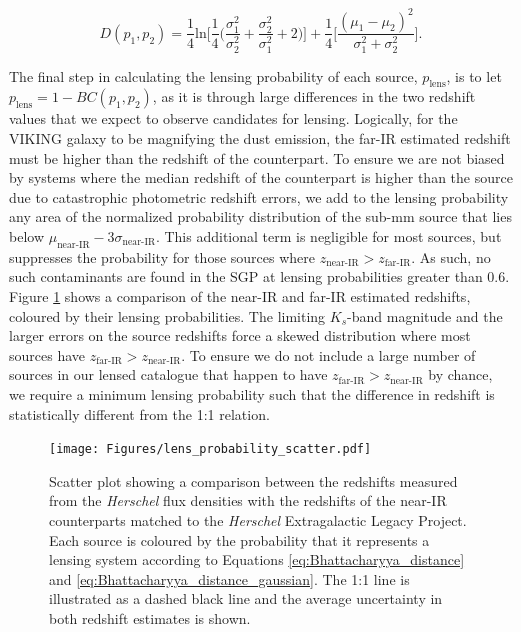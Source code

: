 \begin{equation}
    D(p_1, p_2) = \frac{1}{4}\textrm{ln}\Bigg[\frac{1}{4}\Bigg(\frac{\sigma_1^2}{\sigma_2^2}+\frac{\sigma_2^2}{\sigma_1^2}+2\Bigg)\Bigg] + \frac{1}{4}\Bigg[\frac{(\mu_1 - \mu_2)^2}{\sigma_1^2 + \sigma_2^2}\Bigg].
\label{eq:Bhattacharyya_distance_gaussian}
\end{equation}

The final step in calculating the lensing probability of each source, $p_{\textrm{lens}}$, is to let $p_{\textrm{lens}} = 1 - BC(p_1, p_2)$, as it is through large differences in the two redshift values that we expect to observe candidates for lensing. Logically, for the VIKING galaxy to be magnifying the dust emission, the far-IR estimated redshift must be higher than the redshift of the counterpart. To ensure we are not biased by systems where the median redshift of the counterpart is higher than the source due to catastrophic photometric redshift errors, we add to the lensing probability any area of the normalized probability distribution of the sub-mm source that lies below $\mu_\textrm{near-IR} - 3\sigma_\textrm{near-IR}$. This additional term is negligible for most sources, but suppresses the probability for those sources where $z_\textrm{near-IR} > z_\textrm{far-IR}$. As such, no such contaminants are found in the SGP at lensing probabilities greater than $0.6$. Figure \ref{fig:lens_probability_scatter} shows a comparison of the near-IR and far-IR estimated redshifts, coloured by their lensing probabilities. The limiting $K_s$-band magnitude and the larger errors on the source redshifts force a skewed distribution where most sources have $z_\textrm{far-IR} > z_\textrm{near-IR}$. To ensure we do not include a large number of sources in our lensed catalogue that happen to have $z_\textrm{far-IR} > z_\textrm{near-IR}$ by chance, we require a minimum lensing probability such that the difference in redshift is statistically different from the 1:1 relation.

\begin{figure}
    \centering
    \texttt{[image: Figures/lens\_probability\_scatter.pdf]}
    \caption[Comparison of source and counterpart photometric redshifts]{Scatter plot showing a comparison between the redshifts measured from the \textit{Herschel} flux densities with the redshifts of the near-IR counterparts matched to the \textit{Herschel} Extragalactic Legacy Project. Each source is coloured by the probability that it represents a lensing system according to Equations \ref{eq:Bhattacharyya_distance} and \ref{eq:Bhattacharyya_distance_gaussian}. The 1:1 line is illustrated as a dashed black line and the average uncertainty in both redshift estimates is shown.}
    \label{fig:lens_probability_scatter}
\end{figure}

